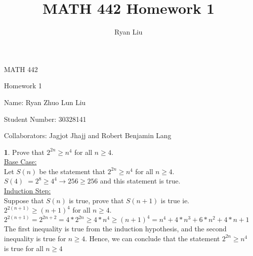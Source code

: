 \documentclass[12pt,a4paper]{article}
\author{Ryan Liu}
\title{MATH 442 Homework 1}
\theoremstyle{definition}
\newtheorem{problem}{}
\begin{document}
\begin{center}
{\huge MATH 442 \par}
{\Large Homework  1  \par}
{\normalsize Name: Ryan Zhuo Lun Liu \par}
{\normalsize Student Number: 30328141 \par}
{\normalsize Collaborators: Jagjot Jhajj and Robert Benjamin Lang }
\end{center}

\begin{problem}
Prove that $2^{2n} \geq n^4$ for all $n\geq4$. \\

\underline{Base Case:} \\
Let $S(n)$ be the statement that $2^{2n} \geq n^4$ for all $n\geq4$. \\
$S(4)$ $= 2^{8} \geq 4^4 \rightarrow 256 \geq 256$ and this statement is true. \\

\underline{Induction Step:} \\
Suppose that $S(n)$ is true, prove that $S(n + 1)$ is true ie. $2^{2(n + 1)} \geq (n + 1)^4$ for all $ n \geq 4$. \\

$2^{2(n + 1)} = 2^{2n + 2} = 4 * 2^{2n} \geq 4 * n^4 \geq (n + 1)^4 = n^4 + 4*n^3 + 6*n^2 + 4*n + 1$ \\

The first inequality is true from the induction hypothesis, and the second inequality is true for $n \geq 4$. Hence, we can conclude that the statement $2^{2n} \geq n^4$ is true for all $n \geq 4$

\end{problem}
\end{document}
